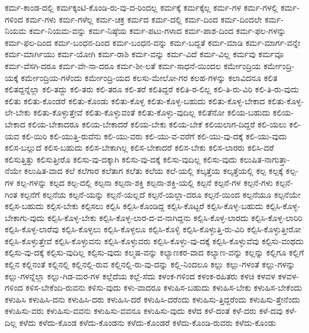{ಕರ್ಮ-ಕಾಂಡ-ದಲ್ಲಿ
ಕರ್ಮಕ್ಕಂಟಿ-ಕೊಂಡಿ-ರು-ವು-ದ-ರಿಂದಲ್ಲ
ಕರ್ಮಕ್ಕೆ
ಕರ್ಮಕ್ಕೆಲ್ಲ
ಕರ್ಮ-ಗಳ
ಕರ್ಮ-ಗಳಲ್ಲಿ
ಕರ್ಮ-ಗಳಿಂದ
ಕರ್ಮ-ಗಳು
ಕರ್ಮ-ಗಳೆಲ್ಲ
ಕರ್ಮ-ಚಕ್ರ
ಕರ್ಮದ
ಕರ್ಮ-ದಲ್ಲಿ
ಕರ್ಮ-ದಿಂದ
ಕರ್ಮ-ದಿಂದಲೇ
ಕರ್ಮ-ನಿಯಮ
ಕರ್ಮ-ನಿಯಮ-ವನ್ನು
ಕರ್ಮ-ನಿಷ್ಠೆಯ
ಕರ್ಮ-ಪಟು-ಗಳಾದ
ಕರ್ಮ-ಪಾಶ-ದಿಂದ
ಕರ್ಮ-ಫಲ-ಗಳನ್ನು
ಕರ್ಮ-ಫಲ-ದಿಂದ
ಕರ್ಮ-ಬಂಧನ-ದಿಂದ
ಕರ್ಮ-ಬಂಧನ-ವನ್ನು
ಕರ್ಮ-ಬದ್ದತೆ
ಕರ್ಮ-ಮಾಡಿ
ಕರ್ಮ-ಮಾರ್ಗ-ವನ್ನೇ
ಕರ್ಮ-ಮಾರ್ಗಿಯು
ಕರ್ಮ-ಯೋಗಿ
ಕರ್ಮ-ರಾಶಿ
ಕರ್ಮ-ವನ್ನು
ಕರ್ಮ-ವಿದೆ
ಕರ್ಮ-ವಿಲ್ಲ
ಕರ್ಮವು
ಕರ್ಮವೂ
ಕರ್ಮ-ವೆಸಗಿ-ದರೂ
ಕರ್ಮ-ವೇ-ನಾ-ದರೂ
ಕರ್ಮ-ಶೀ-ಲತೆ
ಕರ್ಮ-ಸಾಧನೆ-ಯಿಂದಲ
ಕರ್ಮೇಂದ್ರಿಯ
ಕರ್ಮೇಂದ್ರಿ-ಯಕ್ಕೆ
ಕರ್ಮೇಂದ್ರಿಯ-ಗಳೆಂದು
ಕರ್ಮೇಂದ್ರಿ-ಯದ
ಕಲಸು-ಮೇಲೋ-ಗರ
ಕಲಹ-ಗಳನ್ನು
ಕಲಾವಿದನೂ
ಕಲಿತ
ಕಲಿತದ್ದನ್ನೆಲ್ಲಾ
ಕಲಿ-ತದ್ದು
ಕಲಿ-ತರು
ಕಲಿ-ತರೂ
ಕಲಿ-ತರೆ
ಕಲಿತಿದ್ದರೆ
ಕಲಿತಿ-ರ-ಲಿಲ್ಲ
ಕಲಿ-ತಿ-ರು-ವಿರಿ
ಕಲಿ-ತಿ-ರು-ವುದು
ಕಲಿತು
ಕಲಿತು-ಕೊಂಡರೆ
ಕಲಿತು-ಕೊಂಡು
ಕಲಿತು-ಕೊಳ್ಳ
ಕಲಿತು-ಕೊಳ್ಳ-ಬಹುದು
ಕಲಿತು-ಕೊಳ್ಳ-ಬೇಕಾದ
ಕಲಿತು-ಕೊಳ್ಳ-ಲೇ-ಬೇಕು
ಕಲಿತು-ಕೊಳ್ಳುತ್ತೇವೆ
ಕಲಿತು-ಕೊಳ್ಳುವಂತೆ
ಕಲಿತು-ಕೊಳ್ಳು-ವುದಿಲ್ಲ
ಕಲಿತೆನೋ
ಕಲಿಯ-ಬಹುದು
ಕಲಿಯ-ಬೇಕಾದ
ಕಲಿಯ-ಬೇಕಾದರೂ
ಕಲಿಯ-ಬೇಕಾದರೆ
ಕಲಿಯ-ಬೇಕು
ಕಲಿಯ-ಬೇಕೆ
ಕಲಿಯಲಾಗ-ದಿದ್ದರೆ
ಕಲಿ-ಯಲು
ಕಲಿ-ಯವ
ಕಲಿ-ಯಿರಿ
ಕಲಿ-ಯುತ್ತಿ-ರುವೆನು
ಕಲಿ-ಯು-ವರು
ಕಲಿ-ಯು-ವ-ವರೆಗೆ
ಕಲಿ-ಯು-ವು-ದಕ್ಕೆ
ಕಲಿ-ಯು-ವುದು
ಕಲಿಸ-ಬಲ್ಲುದೆ
ಕಲಿಸ-ಬಹುದು
ಕಲಿಸ-ಬೇಕಾಗಿಲ್ಲ
ಕಲಿಸ-ಬೇಕಾದರೆ
ಕಲಿಸ-ಬೇಕು
ಕಲಿಸ-ಲಾರರು
ಕಲಿಸಿ-ದರೆ
ಕಲಿಸುತ್ತಿತ್ತು
ಕಲಿಸುತ್ತೀರೊ
ಕಲಿಸು-ವು-ದಕ್ಕಾಗಿ
ಕಲಿಸು-ವು-ದಕ್ಕೆ
ಕಲಿಸು-ವುದಿಲ್ಲ
ಕಲಿಸು-ವುದು
ಕಲುಷಿತ-ನಾಗುತ್ತಾ-ನೆಯೇ
ಕಲುಷಿತ-ವಾದ
ಕಲೆ
ಕಲೆಗಾರ
ಕಲೆತಾಗ
ಕಲೆತು
ಕಲೆಯ
ಕಲೆ-ಯಲ್ಲಿ
ಕಲ್ಕತ್ತೆಯ
ಕಲ್ಕತ್ತೆಯಲ್ಲಿ
ಕಲ್ಪ
ಕಲ್ಪಕ್ಕೆ
ಕಲ್ಪ-ಗಳ
ಕಲ್ಪ-ಗಳನ್ನು
ಕಲ್ಪದ
ಕಲ್ಪ-ದಲ್ಲಿ
ಕಲ್ಪನಾ
ಕಲ್ಪನಾ-ಶಕ್ತಿ
ಕಲ್ಪನಾ-ಶಕ್ತಿ-ಯಲ್ಲಿ
ಕಲ್ಪನೆ
ಕಲ್ಪನೆ-ಗಳ
ಕಲ್ಪನೆ-ಗಳು
ಕಲ್ಪನೆ-ಗಿಂತ
ಕಲ್ಪನೆಗೆ
ಕಲ್ಪನೆಯ
ಕಲ್ಪನೆ-ಯನ್ನು
ಕಲ್ಪನೆ-ಯಲ್ಲದೆ
ಕಲ್ಪನೆ-ಯಲ್ಲಾ-ದರೂ
ಕಲ್ಪನೆ-ಯಿಂದ
ಕಲ್ಪನೆಯೂ
ಕಲ್ಪನೆಯೇ
ಕಲ್ಪಿಸ-ಬಹುದು
ಕಲ್ಪಿಸ-ಬೇಕು
ಕಲ್ಪಿಸಲು
ಕಲ್ಪಿಸಿ
ಕಲ್ಪಿಸಿ-ಕೊಂಡಿದ್ದ
ಕಲ್ಪಿಸಿ-ಕೊಟ್ಟರೆ
ಕಲ್ಪಿಸಿ-ಕೊಳ್ಳ-ಬಹುದು
ಕಲ್ಪಿಸಿ-ಕೊಳ್ಳ-ಬೇಕಾಗು-ವುದು
ಕಲ್ಪಿಸಿ-ಕೊಳ್ಳ-ಬೇಕು
ಕಲ್ಪಿಸಿ-ಕೊಳ್ಳ-ಲಾರ-ದ-ವ-ನಾಗಿದ್ದನು
ಕಲ್ಪಿಸಿ-ಕೊಳ್ಳ-ಲಾರದು
ಕಲ್ಪಿಸಿ-ಕೊಳ್ಳ-ಲಾರಿರಿ
ಕಲ್ಪಿಸಿ-ಕೊಳ್ಳ-ಲಾರೆವು
ಕಲ್ಪಿಸಿ-ಕೊಳ್ಳಲು
ಕಲ್ಪಿಸಿ-ಕೊಳ್ಳಲೂ
ಕಲ್ಪಿಸಿ-ಕೊಳ್ಳಿ
ಕಲ್ಪಿಸಿ-ಕೊಳ್ಳುತ್ತಿ-ರು-ವಿರಿ
ಕಲ್ಪಿಸಿ-ಕೊಳ್ಳುತ್ತೀರೋ
ಕಲ್ಪಿಸಿ-ಕೊಳ್ಳುತ್ತೇವೆ
ಕಲ್ಪಿಸಿ-ಕೊಳ್ಳುವನು
ಕಲ್ಪಿಸಿ-ಕೊಳ್ಳುವರು
ಕಲ್ಪಿಸಿ-ಕೊಳ್ಳು-ವು-ದಕ್ಕೆ
ಕಲ್ಪಿಸಿ-ಕೊಳ್ಳುವೆವು
ಕಲ್ಪಿಸು-ವಂಥದು
ಕಲ್ಪಿಸು-ವು-ದಕ್ಕೆ
ಕಲ್ಪಿಸು-ವುದಿಲ್ಲ
ಕಲ್ಪಿಸು-ವುದು
ಕಲ್ಮಷ-ವನ್ನು
ಕಲ್ಯಾಣಕರ-ವಾದ
ಕಲ್ಯಾಣ-ವನ್ನು
ಕಲ್ಲನ್ನು
ಕಲ್ಲಿಗೂ
ಕಲ್ಲಿಗೆ
ಕಲ್ಲಿನ
ಕಲ್ಲಿನಂತೆ
ಕಲ್ಲಿನಲ್ಲಿ
ಕಲ್ಲಿನಲ್ಲಿ-ರುವ
ಕಲ್ಲಿನಲ್ಲಿ-ರು-ವು-ದನ್ನು
ಕಲ್ಲಿ-ನಿಂದಲೂ
ಕಲ್ಲು
ಕಲ್ಲು-ಗಳಂತೆ
ಕಲ್ಲು-ಗಳನ್ನು
ಕಲ್ಲು-ಗಳನ್ನೆಲ್ಲಾ
ಕಲ್ಲು-ಗಿಡ-ಮರ-ಗಳ
ಕಲ್ಲೆದೆಯ
ಕಲ್ಲೆ-ಸೆದು
ಕಳಂಕ-ಗಳಿಂದ
ಕಳಂಕ-ರಹಿತರು
ಕಳಚಿ
ಕಳವಳ
ಕಳವಳ-ಗಳಿಂದ
ಕಳಿಸ-ಬೇಕೆಂದಿ-ರುವನು
ಕಳಿಸು-ವುದು
ಕಳು-ವಾದರೂ
ಕಳುಹಿಸ-ಬಹುದು
ಕಳುಹಿಸ-ಬೇಕು
ಕಳುಹಿಸ-ಬೇಕೆಂದು
ಕಳುಹಿಸಿ
ಕಳುಹಿಸಿ-ದನು
ಕಳುಹಿಸಿ-ದರು
ಕಳುಹಿಸಿ-ದರೆ
ಕಳುಹಿಸಿ-ದರೆಂದು
ಕಳುಹಿಸು-ತ್ತಿದ್ದರೆಂದು
ಕಳುಹಿಸು-ತ್ತೇನೆಂದು
ಕಳುಹಿಸು-ವರು
ಕಳುಹಿಸು-ವವನು
ಕಳುಹಿಸು-ವವನೂ
ಕಳುಹಿಸು-ವುದು
ಕಳೆದ
ಕಳೆ-ದಂತೆ
ಕಳೆ-ದರು
ಕಳೆ-ದವು
ಕಳೆ-ದಿಲ್ಲ
ಕಳೆದು
ಕಳೆದು-ಕೊಂಡ
ಕಳೆದು-ಕೊಂಡನು
ಕಳೆದು-ಕೊಂಡರೆ
ಕಳೆದು-ಕೊಂಡಿ-ರುವರು
ಕಳೆದು-ಕೊಂಡು
}
